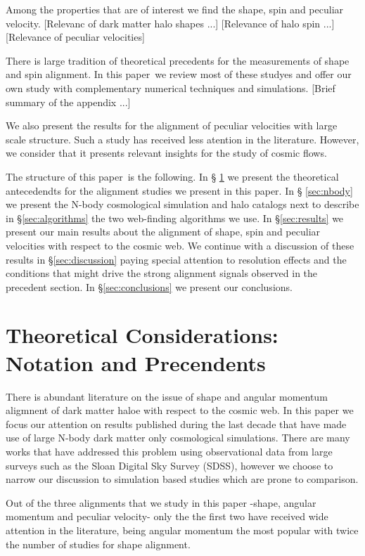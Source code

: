 \documentclass[useAMS,usenatbib]{mn2e}
\newcommand{\documentname}{paper~}
\begin{document}
Among the properties that are of interest we find the shape, spin and
peculiar velocity. [Relevanc of dark matter halo shapes ...]
[Relevance of halo spin ...] [Relevance of peculiar velocities]

There is large tradition of theoretical precedents for the
measurements of shape and spin alignment. In this \documentname we
review most of these studyes and offer our own study with
complementary numerical techniques and simulations. [Brief summary of
  the appendix ...]

We also present the results for the alignment of peculiar velocities
with large scale structure. Such a study has received less atention in
the literature. However, we consider that it presents relevant
insights for the study of cosmic flows.

The structure of this \documentname is the following. In \S
\ref{sec:theory} we present the theoretical antecedendts for the
alignment studies we present in this paper. In \S
\ref{sec:nbody} we present the N-body
cosmological simulation and halo catalogs next to describe in
\S\ref{sec:algorithms} the two web-finding algorithms we use. In
\S\ref{sec:results} we present our main results about the alignment
of shape, spin and peculiar velocities with respect to the cosmic
web. We continue with a discussion of these results in
\S\ref{sec:discussion} paying special attention to resolution effects
and the conditions that might drive the strong alignment signals
observed in the precedent section. In \S\ref{sec:conclusions} we
present our conclusions.


\section{Theoretical Considerations: Notation and Precendents}
\label{sec:theory}

There is abundant literature on the issue of shape and angular momentum
aligmnent of dark matter haloe with respect to the cosmic web. In this
paper we focus our attention on results published during the last
decade that have made use of large N-body dark matter only
cosmological simulations. There are many works that have addressed
this problem using observational data from large surveys such as the
Sloan Digital Sky Survey (SDSS), however we choose to narrow our
discussion to simulation based studies which are prone to comparison.

Out of the three alignments that we study in this paper -shape,
angular momentum and peculiar velocity- only the the first two have
received wide attention in the literature, being angular momentum the
most popular with twice the number of studies for shape alignment.
\end{document}
